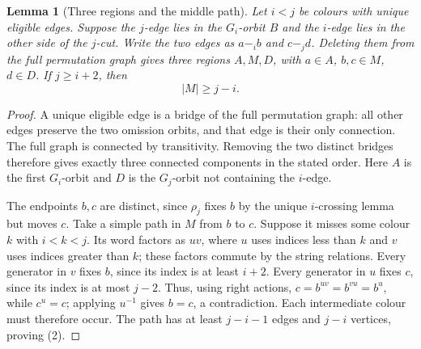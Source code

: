 \documentclass[11pt,a4paper]{article}
\newtheorem{lemma}{Lemma}
\begin{document}
\begin{lemma}[Three regions and the middle path]\label{middle}
Let $i<j$ be colours with unique eligible edges. Suppose the
$j$-edge lies in the $G_i$-orbit $B$ and the $i$-edge lies in
the other side of the $j$-cut. Write the two edges as
$a\mathrel{-_i}b$ and $c\mathrel{-_j}d$. Deleting them from
the full permutation graph gives three regions $A,M,D$,
with $a\in A$, $b,c\in M$, $d\in D$. If $j\geq i+2$, then
\[
                              |M|\geq j-i.              \tag{2}
\]
\end{lemma}
\begin{proof}
A unique eligible edge is a bridge of the full permutation
graph: all other edges preserve the two omission orbits,
and that edge is their only connection. The full graph is
connected by transitivity. Removing the two distinct bridges
therefore gives exactly three connected components in the
stated order. Here $A$ is the first $G_i$-orbit and $D$ is
the $G_j$-orbit not containing the $i$-edge.

The endpoints $b,c$ are distinct, since $\rho_j$ fixes $b$
by the unique $i$-crossing lemma but moves $c$.
Take a simple path in $M$ from $b$ to $c$. Suppose it misses
some colour $k$ with $i<k<j$. Its word factors as $uv$,
where $u$ uses indices less than $k$ and $v$ uses indices
greater than $k$; these factors commute by the string relations.
Every generator in $v$ fixes $b$, since its index is at least
$i+2$. Every generator in $u$ fixes $c$, since its index is
at most $j-2$. Thus, using right actions,
$c=b^{uv}=b^{vu}=b^u$, while $c^u=c$; applying $u^{-1}$
gives $b=c$, a contradiction. Each intermediate colour must
therefore occur. The path has at least $j-i-1$ edges and
$j-i$ vertices, proving (2).
\end{proof}
\end{document}
